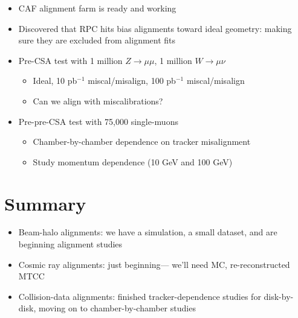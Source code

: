 \documentclass[compress]{beamer}
\begin{document}
\begin{frame}
\begin{itemize}\setlength{\itemsep}{0.65 cm}
\item CAF alignment farm is ready and working
\item Discovered that RPC hits bias alignments toward ideal geometry:
making sure they are excluded from alignment fits
\item Pre-CSA test with 1 million $Z\to\mu\mu$, 1 million $W\to\mu\nu$

\vspace{0.1 cm}
\begin{itemize}\setlength{\itemsep}{0.25 cm}
\item Ideal, 10 pb$^{-1}$ miscal/misalign, 100 pb$^{-1}$ miscal/misalign
\item Can we align with miscalibrations?
\end{itemize}
\item Pre-pre-CSA test with 75,000 single-muons

\vspace{0.1 cm}
\begin{itemize}\setlength{\itemsep}{0.25 cm}
\item Chamber-by-chamber dependence on tracker misalignment
\item Study momentum dependence (10 GeV and 100 GeV)
\end{itemize}
\end{itemize}
\end{frame}

\section*{Summary}

\begin{frame}
\begin{itemize}\setlength{\itemsep}{0.75 cm}
\item Beam-halo alignments: we have a simulation, a small dataset, and are beginning alignment studies
\item Cosmic ray alignments: just beginning--- we'll need MC, re-reconstructed MTCC
\item Collision-data alignments: finished tracker-dependence studies
for disk-by-disk, moving on to chamber-by-chamber studies
\end{itemize}
\label{numpages}
\end{frame}
\end{document}
